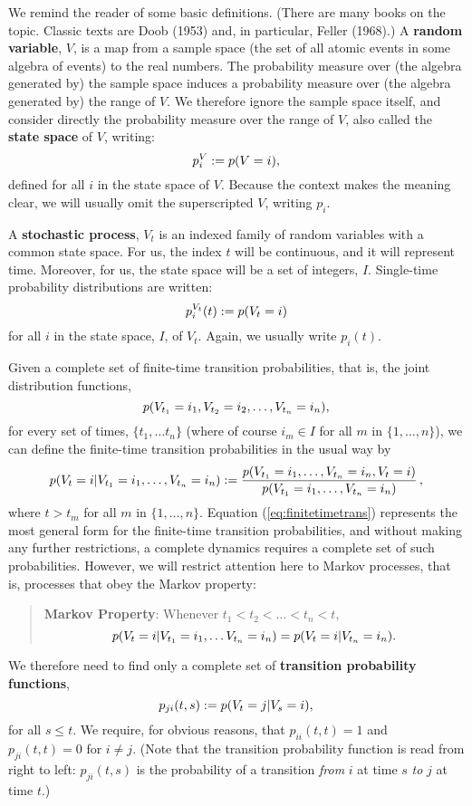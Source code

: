 \documentclass[12pt]{article}
\newcommand{\be}{\vspace*{6pt} \begin{equation}}
\newcommand{\ee}{\vspace*{10pt} \end{equation}}
\begin{document}
We remind the reader of some basic definitions.  (There are many books 
on the topic.  Classic texts are Doob (1953) and, in particular, 
Feller (1968).) A {\bf random variable}, $V$, is a map from a sample 
space (the set of all atomic events in some algebra of events) to the 
real numbers.  The probability measure over (the algebra generated by) 
the sample space induces a probability measure over (the algebra 
generated by) the range of $V$.  We therefore ignore the sample space 
itself, and consider directly the probability measure over the range 
of $V$, also called the {\bf state space} of $V$, writing:
\be
p^{V}_{i} := p(V = i),
\ee
\noindent defined for all $i$ in the state space of $V$.  Because the
context makes the meaning clear, we will usually omit the
superscripted $V$, writing $p_{i}$.

A {\bf stochastic process}, $V_{t}$ is an indexed family of random
variables with a common state space.  For us, the index $t$ will be
continuous, and it will represent time.  Moreover, for us, the state
space will be a set of integers, $I$.  Single-time probability
distributions are written:
\be
p^{V_t}_{i}(t) := p(V_{t} = i)
\ee
\noindent for all $i$ in the state space, $I$, of $V_{t}$.  Again, we
usually write $p_{i}(t)$.

Given a complete set of finite-time transition probabilities, that
is, the joint distribution functions,
\be
p(V_{t_{1}} = i_{1}, V_{t_{2}} = i_{2}, \ldots , V_{t_{n}} = i_{n}),
\ee
for every set of times, $\{t_{1}, \ldots t_{n}\}$ (where of course
$i_{m} \in I$ for all $m$ in $\{1, \ldots , n\}$), we can define the
finite-time transition probabilities in the usual way by
\be
\label{eq:finitetimetrans}
p(V_{t} = i | V_{t_{1}} = i_{1}, \ldots , V_{t_{n}} = i_{n}) :=
\frac{p(V_{t_{1}} = i_{1}, \ldots , V_{t_{n}} = i_{n}, V_{t} =
i)}{p(V_{t_{1}} = i_{1}, \ldots , V_{t_{n}} = i_{n})}\, ,
\ee
where $t > t_m$ for all $m$ in $\{1, \ldots , n \}$.  Equation
(\ref{eq:finitetimetrans}) represents the most general form for the
finite-time transition probabilities, and without making any further
restrictions, a complete dynamics requires a complete set of such
probabilities.  However, we will restrict attention here to Markov
processes, that is, processes that obey the Markov property:
\begin{quotation}
{\bf Markov Property}:  Whenever $t_{1} < t_{2} < \ldots < t_{n} < t$,
\be
p(V_{t} = i | V_{t_{1}} = i_{1}, \ldots V_{t_{n}} = i_n) =
p(V_{t} = i | V_{t_{n}} = i_n).
\ee
\end{quotation}
\noindent We therefore need to find only a complete set of {\bf transition
probability functions},
\be
p_{ji}(t,s) := p(V_{t} = j | V_{s} = i),
\ee
for all $s \leq t$.  We require, for obvious reasons, that
$p_{ii}(t,t) = 1$ and $p_{ji}(t,t) = 0$ for $i \neq j$.  (Note
that the transition probability function is read from right to left:
$p_{ji}(t,s)$ is the probability of a transition {\it from} $i$ at time $s$
{\it to} $j$ at time $t$.)
\end{document}
